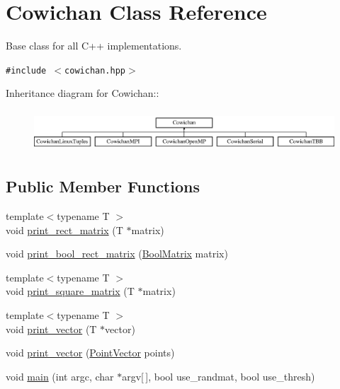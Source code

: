 \hypertarget{class_cowichan}{
\section{Cowichan Class Reference}
\label{class_cowichan}
}
Base class for all C++ implementations.  


{\tt \#include $<$cowichan.hpp$>$}

Inheritance diagram for Cowichan::\begin{figure}[H]
\begin{center}
\leavevmode
\includegraphics[height=1.56643cm]{class_cowichan}
\end{center}
\end{figure}
\subsection*{Public Member Functions}
\begin{CompactItemize}
\item 
{\footnotesize template$<$typename T $>$ }\\void \hyperlink{class_cowichan_14e706ef5a5f7661a623c595d7ed76f1}{print\_\-rect\_\-matrix} (T $\ast$matrix)
\item 
void \hyperlink{class_cowichan_c3470807a8cdd1bfc6cf89f864f330bc}{print\_\-bool\_\-rect\_\-matrix} (\hyperlink{cowichan_8hpp_a64c8df2f1e9c8ea68a7bcc19aca683e}{BoolMatrix} matrix)
\item 
{\footnotesize template$<$typename T $>$ }\\void \hyperlink{class_cowichan_e8fdfb7dd3e8be0a7e9dbc531b1298d2}{print\_\-square\_\-matrix} (T $\ast$matrix)
\item 
{\footnotesize template$<$typename T $>$ }\\void \hyperlink{class_cowichan_90f1155f5c35308796b142b15d681a4b}{print\_\-vector} (T $\ast$vector)
\item 
void \hyperlink{class_cowichan_3b974ae1693ac661fb079b28981ca885}{print\_\-vector} (\hyperlink{class_point}{PointVector} points)
\item 
void \hyperlink{class_cowichan_905f3eb45f21cdaa1c32a421d001fa4c}{main} (int argc, char $\ast$argv\mbox{[}$\,$\mbox{]}, bool use\_\-randmat, bool use\_\-thresh)
\end{CompactItemize}
